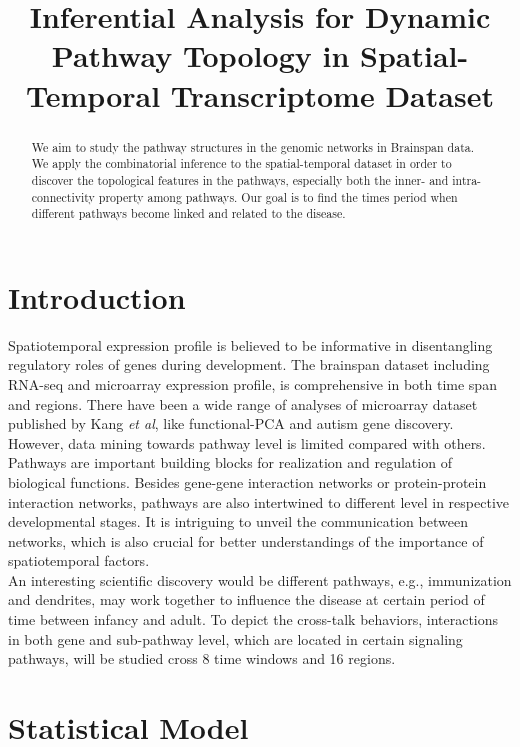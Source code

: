 \documentclass[11pt]{article}
\begin{document}
\title{\huge Inferential Analysis for Dynamic Pathway Topology in Spatial-Temporal Transcriptome Dataset}
\author{}
\maketitle

\begin{abstract}
  We aim to study the pathway structures in the genomic networks in Brainspan data. We apply the combinatorial inference to the spatial-temporal dataset in order to discover the topological features in the pathways, especially both the inner- and intra-connectivity property among pathways.  Our goal is to find the times period when different pathways become linked and related to the disease. 
\end{abstract}


\section{Introduction}

Spatiotemporal expression profile is believed to be informative in disentangling regulatory roles of genes during development. The brainspan dataset including RNA-seq and microarray expression profile, is  comprehensive in both time span and regions. There have been a wide range of analyses of microarray dataset published by Kang \textit{et al}, like functional-PCA and autism gene discovery. However, data mining towards pathway level is limited compared with others. \\
Pathways are important building blocks for realization and regulation of biological functions. Besides gene-gene interaction networks or protein-protein interaction networks, pathways are also intertwined to different level in respective developmental stages. It is intriguing to unveil the communication between networks, which is also crucial for better understandings of the importance of spatiotemporal factors.\\
\noindent
An interesting scientific discovery would be different pathways, e.g., immunization and dendrites, may work together to influence the disease at certain period of time between infancy and adult. To depict the cross-talk behaviors, interactions in both gene and sub-pathway level, which are located in certain signaling pathways, will be studied cross 8 time windows and 16 regions.

\section{Statistical Model}
\end{document}
